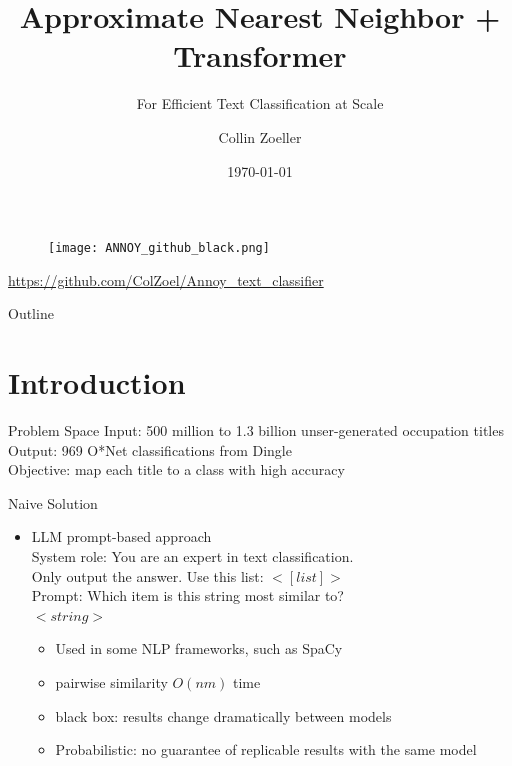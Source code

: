 \documentclass{beamer}
\title{Approximate Nearest Neighbor + Transformer}
\subtitle{For Efficient Text Classification at Scale}
\author{Collin Zoeller}
\institute{Carnegie Mellon University}
\date{\today}
\begin{document}
\begin{frame}
    \titlepage
\end{frame}


\begin{frame}
    \begin{figure}
        \centering
        \texttt{[image: ANNOY\_github\_black.png]}
    \end{figure}
\centering
\small \href{https://github.com/ColZoel/Annoy_text_classifier}{https://github.com/ColZoel/Annoy\_text\_classifier}
\end{frame}


\begin{frame}{Outline}
    \tableofcontents
\end{frame}


\section{Introduction}

\begin{frame}{Problem Space}
    Input: 500 million to 1.3 billion unser-generated occupation titles
    \\Output: 969 O*Net classifications from Dingle
    \\Objective: map each title to a class with high accuracy
\end{frame}

\begin{frame}{Naive Solution}
    \begin{itemize}
        \item LLM prompt-based approach\\
        System role: You are an expert in text classification. \\Only output the answer. Use this list: $<[list]>$\\
        Prompt: Which item is this string most similar to? \\$<string>$
        \begin{itemize}
            \item Used in some NLP frameworks, such as SpaCy
            \item pairwise similarity $O(nm)$ time
            \item black box: results change dramatically between models
            \item Probabilistic: no guarantee of replicable results with the same model 
        \end{itemize}
    \end{itemize}
\end{frame}
\end{document}

